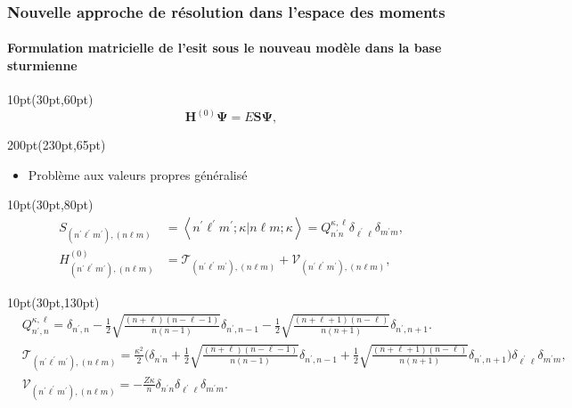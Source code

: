 \begin{frame}
 \frametitle{Nouvelle approche de r\'esolution dans l'espace des moments}
 \framesubtitle{Formulation matricielle de l'\acrshort{esit} 
sous le nouveau mod\`ele dans la base sturmienne}

\begin{textblock*}{10pt}(30pt,60pt)
\footnotesize
\begin{equation*}
  \mathbf{H}^{(0)} \mathbf{\Psi} = E \mathbf{S}\mathbf{\Psi},
\end{equation*}
\end{textblock*}


\begin{textblock*}{200pt}(230pt,65pt)
\small
\begin{itemize}
 \item Probl\`eme aux valeurs propres g\'en\'eralis\'e
\end{itemize}
\end{textblock*}

\begin{textblock*}{10pt}(30pt,80pt)
\footnotesize
\begin{align*}
S_{(n^\prime \ell^\prime m^\prime),(n\ell m)}
  & = \left\langle n^\prime \ell^\prime m^\prime ; \kappa
   | n\ell m ; \kappa \right\rangle = Q_{n^\prime n}^{\kappa,\ell}
   \delta_{\ell^\prime \ell}\delta_{m^\prime m},  \\
 H^{(0)}_{(n^\prime \ell^\prime m^\prime),(n\ell m)}
  & = \mathcal{T}_{(n^\prime \ell^\prime m^\prime),(n\ell m)}
    + \mathcal{V}_{(n^\prime \ell^\prime m^\prime),(n\ell m)},
     \label{eqn:unperturbed_terms}
\end{align*}

\end{textblock*}


\begin{textblock*}{10pt}(30pt,130pt)
\footnotesize
\begin{align*}
& Q_{n^\prime,n}^{\kappa,\ell} = \delta_{n^\prime,n}
- \frac{1}{2}\sqrt{\frac{(n+\ell)(n-\ell-1)}{n(n-1)}} \delta_{n^\prime, n-1}
- \frac{1}{2}\sqrt{\frac{(n+\ell+1)(n-\ell)}{n(n+1)}} \delta_{n^\prime, n+1}. \\
&  \mathcal{T}_{(n^\prime \ell^\prime m^\prime),(n\ell m)}
    \hspace{0cm} = \frac{\kappa^2}{2}\Bigg(\delta_{n^\prime n} 
    + \frac{1}{2}\sqrt{\frac{(n+\ell)(n-\ell-1)}{n(n-1)}}\delta_{n^\prime, n-1}
   \hspace{0cm} + \frac{1}{2}\sqrt{\frac{(n+\ell+1)(n-\ell)}{n(n+1)}}
   \delta_{n^\prime, n+1}\Bigg)\delta_{\ell^\prime \ell}\delta_{m^\prime m},\\
&  \mathcal{V}_{(n^\prime \ell^\prime m^\prime),(n\ell m)}
   = -\frac{Z\kappa}{n}\delta_{n^\prime n}
      \delta_{\ell^\prime \ell}\delta_{m^\prime m}.
\end{align*}


\end{textblock*}
\end{frame}
